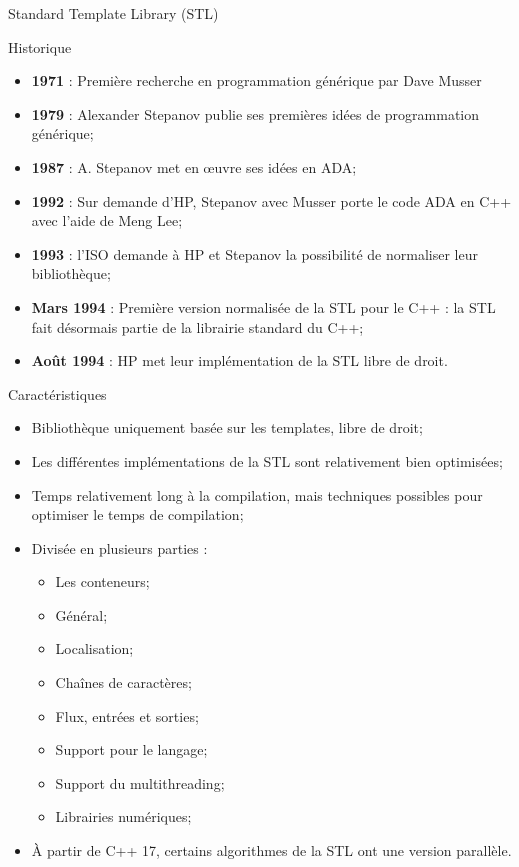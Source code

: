 \documentclass[handout,10pt]{beamer}
\begin{document}
\begin{frame}[fragile]{Standard Template Library (STL)}
\tiny
\begin{block}{Historique}
\begin{itemize}
 \item \textbf{\color{red}1971} : Première recherche en programmation générique par Dave Musser
 \item \textbf{\color{red}1979} : Alexander Stepanov publie ses premières idées de programmation générique;
 \item \textbf{\color{red}1987} : A. Stepanov met en {\oe}uvre ses idées en ADA;
 \item \textbf{\color{red}1992} : Sur demande d'HP, Stepanov avec Musser porte le code ADA en C++ avec l'aide de Meng Lee;
 \item \textbf{\color{red}1993} : l'ISO demande à HP et Stepanov la possibilité de normaliser leur bibliothèque;
 \item \textbf{\color{red}Mars 1994} : Première version normalisée de la STL pour le C++ : la STL fait désormais partie de la librairie standard du C++;
 \item \textbf{\color{red}Août 1994} : HP met leur implémentation de la STL libre de droit.
\end{itemize}
\end{block}

\begin{block}{Caractéristiques}
\begin{itemize}
 \item Bibliothèque uniquement basée sur les templates, libre de droit;
 \item Les différentes implémentations de la STL sont relativement bien optimisées;
 \item Temps relativement long à la compilation, mais techniques possibles pour optimiser le temps de compilation;
 \item Divisée en plusieurs parties :
 \begin{itemize}
 \item Les conteneurs;
 \item Général;
 \item Localisation;
 \item Chaînes de caractères;
 \item Flux, entrées et sorties;
 \item Support pour le langage;
 \item Support du multithreading;
 \item Librairies numériques;
 \end{itemize}
 \item À partir de C++ 17, certains algorithmes de la STL ont une version parallèle.
\end{itemize}
\end{block}
\end{frame}
\end{document}
